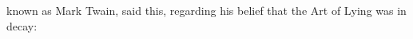 \documentclass{novelette}
\begin{document}
\begin{opening}
\null\null\null\null\null\null
{}
\null\null\null\null\null
\end{opening}
 known as Mark Twain, said this, regarding
his belief that the Art of Lying was in decay:\par

\fillertext
\end{document}
